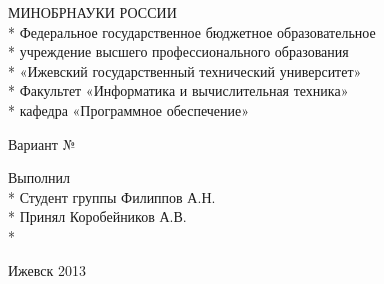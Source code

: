 \begin{titlepage}
\newpage

\begin{center}
МИНОБРНАУКИ РОССИИ\\*
Федеральное государственное бюджетное образовательное\\*
учреждение высшего профессионального образования\\*
«Ижевский государственный технический университет»\\*
Факультет «Информатика и вычислительная техника»\\*
кафедра «Программное обеспечение»
\vspace{1cm}
\end{center}

\vspace{8em}

\begin{center}
\titletext
\end{center}

\vspace{2.5em}

\begin{center}
Вариант №\myvariant
\end{center}

\vspace{6em}

\begin{flushleft}
Выполнил\\*
Студент группы \mygroup \hfill Филиппов А.Н.\\*
\vspace{1.5em}
Принял \hfill Коробейников А.В.\\*
\end{flushleft}

\vspace{\fill}

\begin{center}
Ижевск 2013
\end{center}

\end{titlepage}
